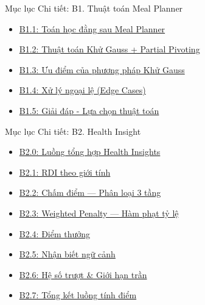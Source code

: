 \documentclass[10pt, aspectratio=169]{beamer}
\begin{document}
\begin{frame}[label=subtoc_b1]{Mục lục Chi tiết: B1. Thuật toán Meal Planner}
\hypertarget{subtoc_b1_target}{}
    \vspace{0.5cm}
    \begin{itemize}
        \setlength\itemsep{0.5cm}
        \Large
        \item[\textcolor{NutriDark}{$\blacktriangleright$}] \hyperlink{b1_1_target}{B1.1: Toán học đằng sau Meal Planner}
        \item[\textcolor{NutriDark}{$\blacktriangleright$}] \hyperlink{b1_2_target}{B1.2: Thuật toán Khử Gauss + Partial Pivoting}
        \item[\textcolor{NutriDark}{$\blacktriangleright$}] \hyperlink{b1_3_target}{B1.3: Ưu điểm của phương pháp Khử Gauss}
        \item[\textcolor{NutriDark}{$\blacktriangleright$}] \hyperlink{b1_4_target}{B1.4: Xử lý ngoại lệ (Edge Cases)}
        \item[\textcolor{NutriDark}{$\blacktriangleright$}] \hyperlink{b1_5_target}{B1.5: Giải đáp - Lựa chọn thuật toán}
    \end{itemize}
\end{frame}

\begin{frame}[label=subtoc_b2]{Mục lục Chi tiết: B2. Health Insight}
\hypertarget{subtoc_b2_target}{}
    \vspace{0.3cm}
    \begin{itemize}
        \setlength\itemsep{0.4cm}
        \large
        \item[\textcolor{NutriDark}{$\blacktriangleright$}] \hyperlink{b2_0_target}{B2.0: Luồng tổng hợp Health Insights}
        \item[\textcolor{NutriDark}{$\blacktriangleright$}] \hyperlink{b2_1_target}{B2.1: RDI theo giới tính}
        \item[\textcolor{NutriDark}{$\blacktriangleright$}] \hyperlink{b2_2_target}{B2.2: Chấm điểm — Phân loại 3 tầng}
        \item[\textcolor{NutriDark}{$\blacktriangleright$}] \hyperlink{b2_3_target}{B2.3: Weighted Penalty — Hàm phạt tỷ lệ}
        \item[\textcolor{NutriDark}{$\blacktriangleright$}] \hyperlink{b2_4_target}{B2.4: Điểm thưởng}
        \item[\textcolor{NutriDark}{$\blacktriangleright$}] \hyperlink{b2_5_target}{B2.5: Nhận biết ngữ cảnh}
        \item[\textcolor{NutriDark}{$\blacktriangleright$}] \hyperlink{b2_6_target}{B2.6: Hệ số trượt \& Giới hạn trần}
        \item[\textcolor{NutriDark}{$\blacktriangleright$}] \hyperlink{b2_7_target}{B2.7: Tổng kết luồng tính điểm}
    \end{itemize}
\end{frame}
\end{document}
